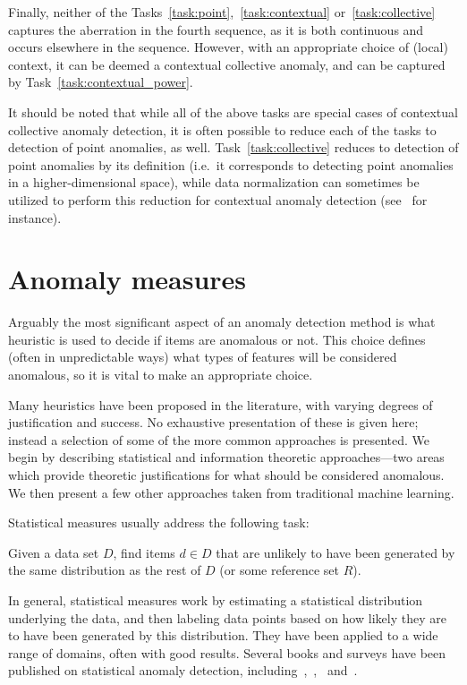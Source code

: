 Finally, neither of the Tasks~\ref{task:point},~\ref{task:contextual} or~\ref{task:collective} captures the aberration in the fourth sequence, as it is both continuous and occurs elsewhere in the sequence. However, with an appropriate choice of (local) context, it can be deemed a contextual collective anomaly, and can be captured by Task~\ref{task:contextual_power}.

It should be noted that while all of the above tasks are special cases of contextual collective anomaly detection, it is often possible to reduce each of the tasks to detection of point anomalies, as well. Task~\ref{task:collective} reduces to detection of point anomalies by its definition (i.e.\ it corresponds to detecting point anomalies in a higher-dimensional space), while data normalization can sometimes be utilized to perform this reduction for contextual anomaly detection (see~\cite{meckesheimer} for instance).

\section{Anomaly measures}
\label{sect:anomaly_measures}

Arguably the most significant aspect of an anomaly detection method is what heuristic is used to decide if items are anomalous or not. This choice defines (often in unpredictable ways) what types of features will be considered anomalous, so it is vital to make an appropriate choice.

Many heuristics have been proposed in the literature, with varying degrees of justification and success. No exhaustive presentation of these is given here; instead a selection of some of the more common approaches is presented. We begin by describing statistical and information theoretic approaches---two areas which provide theoretic justifications for what should be considered anomalous. We then present a few other approaches taken from traditional machine learning.

Statistical measures usually address the following task:
\begin{task}
\label{task:statistical}
  Given a data set $D$, find items $d \in D$ that are unlikely to have been generated by the same distribution as the rest of $D$ (or some reference set $R$).
\end{task}
In general, statistical measures work by estimating a statistical distribution underlying the data, and then labeling data points based on how likely they are to have been generated by this distribution. They have been applied to a wide range of domains, often with good results. Several books and surveys have been published on statistical anomaly detection, including~\cite{barnett},~\cite{bakar},~\cite{leroy} and~\cite{hawkins}.

